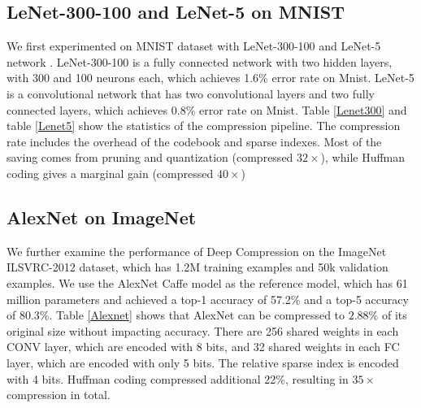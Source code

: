 \documentclass{article} %
\begin{document}
\subsection{LeNet-300-100 and LeNet-5 on MNIST}

We first experimented on MNIST dataset with LeNet-300-100 and LeNet-5 network \citep{lecun1998gradient}. LeNet-300-100 is a fully connected network with two hidden layers, with 300 and 100 neurons each, which achieves 1.6\% error rate on Mnist. LeNet-5 is a convolutional network that has two convolutional layers and two fully connected layers, which  achieves 0.8\% error rate on Mnist.  Table \ref{Lenet300} and table \ref{Lenet5} show the statistics of the compression pipeline. The compression rate includes the overhead of the codebook and sparse indexes. Most of the saving comes from pruning and quantization (compressed $32\times$), while Huffman coding gives a marginal gain (compressed $40\times$)





\subsection{AlexNet on ImageNet}
We further examine the performance of Deep Compression on the ImageNet ILSVRC-2012 dataset, which has 1.2M training examples and 50k validation examples. We use the AlexNet Caffe model as the reference model, which has 61 million parameters and achieved a top-1 accuracy of 57.2\% and a top-5 accuracy of 80.3\%. Table \ref{Alexnet} shows that AlexNet can be compressed to $2.88\%$ of its original size without impacting accuracy. There are 256 shared weights in each CONV layer, which are encoded with 8 bits, and 32 shared weights in each FC layer, which are encoded with only 5 bits. The relative sparse index is encoded with 4 bits.  Huffman coding compressed additional 22\%, resulting in $35\times$ compression in total.
\end{document}
